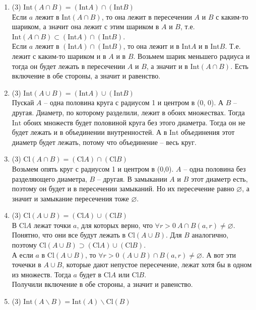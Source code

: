 \documentclass[a4paper]{article}
\def\Int{\mathrm{Int}}
\def\Cl{\mathrm{Cl}}
\begin{document}
\begin{enumerate}
    \begin{enumerate}
        \item (3) $\Int (A\cap B) = (\Int A)\cap(\Int B)$\\
        Если $a$ лежит в $\Int (A\cap B)$, то она лежит в пересечении $A$ и $B$ с каким-то шариком, а значит она лежит с этим шариком в $A$ и $B$, т.е. $\Int (A\cap B)\subset (\Int A)\cap (\Int B)$.\\
        Если $a$ лежит в $(\Int A)\cap(\Int B)$, то она лежит и в $\Int A$ и в $\Int B$. Т.е. лежит с каким-то шариком и в $A$ и в $B$. Возьмем шарик меньшего радиуса и тогда он будет лежать в пересечении $A$ и $B$, а значит и в $\Int(A\cap B)$.
        Есть включение в обе стороны, а значит и равенство.
        \item (3) $\Int (A\cup B) = (\Int A)\cup(\Int B)$\\
        Пускай $A$ -- одна половина круга с радиусом 1 и центром в (0, 0). А $B$ -- другая. Диаметр, по которому разделили, лежит в обоих множествах. Тогда $\Int$ обоих множеств будет половиной круга без этого диаметра. Тогда он не будет лежать и в объединении внутренностей. А в $\Int$ объединения этот диаметр будет лежать, потому что объединение -- весь круг.
        \item (3) $\Cl (A\cap B) = (\Cl A)\cap(\Cl B)$\\
        Возьмем опять круг с радиусом 1 и центром в (0,0). $A$ -- одна половина без разделяющего диаметра, $B$ -- другая. В замыкании $A$ и $B$ этот диаметр есть, поэтому он будет и в пересечении замыканий. Но их пересечение равно $\varnothing$, а значит и замыкание пересечения тоже $\varnothing$.
        \item (3) $\Cl (A\cup B) = (\Cl A)\cup(\Cl B)$\\
        В $\Cl A$ лежат точки $a$, для которых верно, что $\forall r > 0\ A\cap B(a, r) \neq \varnothing$. Понятно, что они все будут лежать в $\Cl (A\cup B)$. Для $B$ аналогично, поэтому $\Cl (A\cup B) \supset (\Cl A)\cup(\Cl B)$.\\
        А если $a$ в $\Cl(A\cup B)$, то $\forall r > 0\ (A\cup B)\cap B(a, r) \neq \varnothing$. А вот эти точечки в $A\cup B$, которые дают непустое пересечение, лежат хотя бы в одном из множеств. Тогда $a$ будет в $\Cl A$ или $\Cl B$.\\
        Получили включение в обе стороны, а значит и равенство.
        \item (3) $\Int (A\smallsetminus B) = \Int (A)\smallsetminus \Cl(B)$\\

\end{enumerate}
\end{enumerate}
\end{document}
